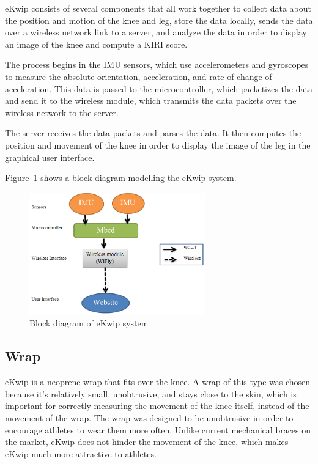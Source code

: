 eKwip consists of several components that all work together to collect data about the position and motion of the knee and leg, store the data locally, sends the data over a wireless network link to a server, and analyze the data in order to display an image of the knee and compute a KIRI score.

The process begins in the IMU sensors, which use accelerometers and gyroscopes to measure the absolute orientation, acceleration, and rate of change of acceleration. This data is passed to the microcontroller, which packetizes the data and send it to the wireless module, which transmits the data packets over the wireless network to the server.

The server receives the data packets and parses the data. It then computes the position and movement of the knee in order to display the image of the leg in the graphical user interface.

Figure~\ref{fig:block_diagram} shows a block diagram modelling the eKwip system.

\begin{figure}[h]
  \begin{center}
    \includegraphics[width=3in]{images/block_diagram.PNG}
  \end{center}
  \caption{Block diagram of eKwip system}
  \label{fig:block_diagram}
\end{figure}

\subsection {Wrap}
eKwip is a neoprene wrap that fits over the knee. A wrap of this type was chosen because it's relatively small, unobtrusive, and stays close to the skin, which is important for correctly measuring the movement of the knee itself, instead of the movement of the wrap. The wrap was designed to be unobtrusive in order to encourage athletes to wear them more often. Unlike current mechanical braces on the market, eKwip does not hinder the movement of the knee, which makes eKwip much more attractive to athletes.

